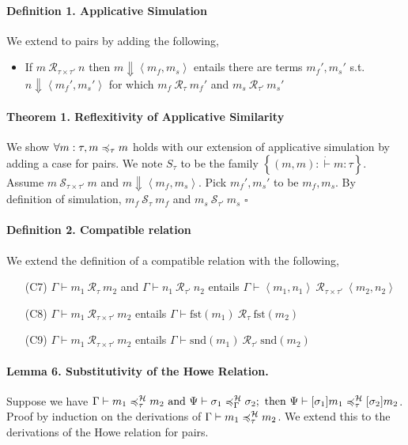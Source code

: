 \documentclass{article}
\begin{document}
\paragraph{Definition 1. Applicative Simulation} We extend to pairs by adding the following, \begin{itemize}
    \item If \(m ~\mathcal{R}_{\tau\times\tau'}~n\) then \(m\Downarrow \left\langle m_f,m_s \right\rangle \) entails there are terms \(m_f',m_s'\) s.t. \(n\Downarrow \left\langle m_f',m_s' \right\rangle \) for which \(m_f ~\mathcal{R}_{\tau}~m_f'\) and \(m_s ~\mathcal{R}_{\tau'}~m_s'\)
\end{itemize}

\paragraph{Theorem 1. Reflexitivity of Applicative Similarity} We show \(\forall m:\tau,m\asim m\) holds with our extension of applicative simulation by adding a case for pairs. We note \(S_{\tau}\) to be the family \(\left\{ (m,m) : \dot\vdash m:\tau \right\} \). Assume \(m~\mathcal{S}_{\tau\times\tau'}~m\) and \(m\Downarrow \left\langle m_f,m_s \right\rangle \). Pick \(m_f',m_s'\) to be \(m_f,m_s\). By definition of simulation, \(m_f~\mathcal{S}_{\tau}~m_f\) and \(m_s~\mathcal{S}_{\tau'}~m_s\) \hfill \(\square\)

\paragraph{Definition 2. Compatible relation} We extend the definition of a compatible relation with the following, \begin{itemize}
    \item[(C7)] \(\Gamma\vdash m_1~\mathcal{R}_{\tau}~m_2\) and \(\Gamma\vdash n_1~\mathcal{R}_{\tau'}~n_2\) entails \(\Gamma\vdash \left\langle m_1,n_1 \right\rangle ~\mathcal{R}_{\tau\times\tau'}~\left\langle m_2,n_2 \right\rangle \)
    \item[(C8)] \(\Gamma\vdash m_1~\mathcal{R}_{\tau\times\tau'}~m_2\) entails \(\Gamma\vdash \text{fst}(m_1)~\mathcal{R}_{\tau}~\text{fst}(m_2)\)
    \item[(C9)] \(\Gamma\vdash m_1~\mathcal{R}_{\tau\times\tau'}~m_2\) entails \(\Gamma\vdash \text{snd}(m_1)~\mathcal{R}_{\tau'}~\text{snd}(m_2)\)
\end{itemize}


\paragraph{Lemma 6. Substitutivity of the Howe Relation.} Suppose we have \(\Gamma\vdash m_1 \howe m_2 \text{ and } \Psi \vdash \sigma_1 \howe[\Gamma] \sigma_2; \text{ then } \Psi \vdash [\sigma_1]m_1 \howe{}
[\sigma_2]m_2\). Proof by induction on the derivations of \( \Gamma \vdash m_1 \howe m_2\). We extend this to the derivations of the Howe relation for pairs.
\end{document}
